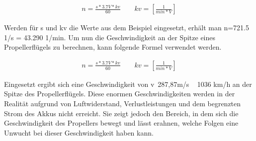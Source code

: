         \begin{align}
            n=\frac{s*3.7V*kv}{60} \qquad kv=[\frac{1}{min*V}]
        \end{align}

        Werden für s und kv die Werte aus dem Beispiel eingesetzt, erhält man n=721.5 1/s = 43.290 1/min. Um nun die Geschwindigkeit an der Spitze eines Propellerflügels zu berechnen, kann folgende Formel verwendet werden.
        
        \begin{align}
            n=\frac{s*3.7V*kv}{60} \qquad kv=[\frac{1}{min*V}]
        \end{align}

        Eingesetzt ergibt sich eine Geschwindigkeit von v~287,87m/s ~ 1036 km/h an der Spitze des Propellerflügels. Diese enormen Geschwindigkeiten werden in der Realität aufgrund von Luftwiderstand, Verlustleistungen und dem begrenzten Strom des Akkus nicht erreicht. Sie zeigt jedoch den Bereich, in dem sich die Geschwindigkeit des Propellers bewegt und lässt erahnen, welche Folgen eine Unwucht bei dieser Geschwindigkeit haben kann.